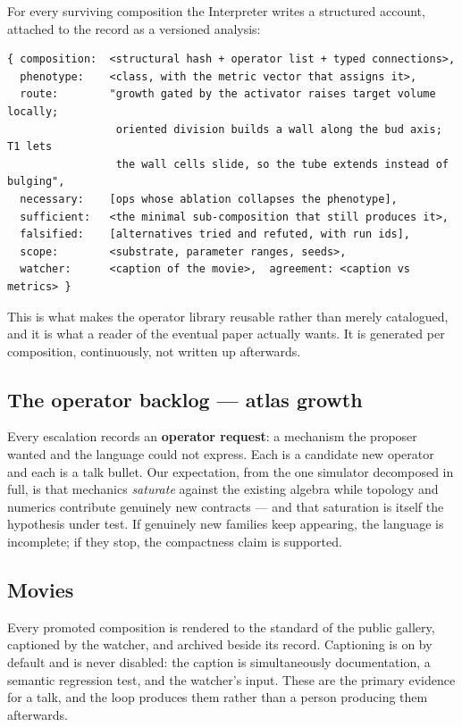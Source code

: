 \documentclass[11pt]{article}
\begin{document}
For every surviving composition the Interpreter writes a structured account, attached to the
record as a versioned analysis:

\begin{lstlisting}
{ composition:  <structural hash + operator list + typed connections>,
  phenotype:    <class, with the metric vector that assigns it>,
  route:        "growth gated by the activator raises target volume locally;
                 oriented division builds a wall along the bud axis; T1 lets
                 the wall cells slide, so the tube extends instead of bulging",
  necessary:    [ops whose ablation collapses the phenotype],
  sufficient:   <the minimal sub-composition that still produces it>,
  falsified:    [alternatives tried and refuted, with run ids],
  scope:        <substrate, parameter ranges, seeds>,
  watcher:      <caption of the movie>,  agreement: <caption vs metrics> }
\end{lstlisting}

This is what makes the operator library reusable rather than merely catalogued, and it is what a
reader of the eventual paper actually wants. It is generated per composition, continuously, not
written up afterwards.

\subsection{The operator backlog --- atlas growth}

Every escalation records an \textbf{operator request}: a mechanism the proposer wanted and the
language could not express. Each is a candidate new operator and each is a talk bullet. Our
expectation, from the one simulator decomposed in full, is that mechanics \emph{saturate} against
the existing algebra while topology and numerics contribute genuinely new contracts --- and that
saturation is itself the hypothesis under test. If genuinely new families keep appearing, the
language is incomplete; if they stop, the compactness claim is supported.

\subsection{Movies}

Every promoted composition is rendered to the standard of the public gallery, captioned by the
watcher, and archived beside its record. Captioning is on by default and is never disabled: the
caption is simultaneously documentation, a semantic regression test, and the watcher's input.
These are the primary evidence for a talk, and the loop produces them rather than a person
producing them afterwards.
\end{document}

